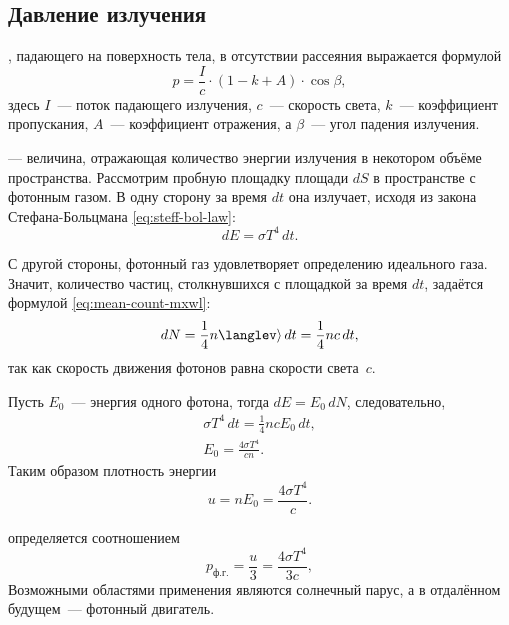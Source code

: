 \subsection{Давление излучения}
, падающего на поверхность тела, в отсутствии рассеяния выражается формулой
\begin{equation}
    p = \frac{I}{c} \cdot (1 - k + A) \cdot \cos \beta,
\end{equation}
здесь $I$~--- поток падающего излучения, $c$~--- скорость света, $k$~--- коэффициент пропускания, $A$~--- коэффициент отражения, а $\beta$~--- угол падения излучения.

 — величина, отражающая количество энергии излучения в некотором объёме пространства. Рассмотрим пробную  площадку площади $dS$ в пространстве с фотонным газом. В одну сторону за время $dt$ она излучает, исходя из закона Стефана-Больцмана \eqref{eq:steff-bol-law}:
\begin{equation*}
	d E = \sigma T^4 \, d t.
\end{equation*}

С другой стороны, фотонный газ удовлетворяет определению идеального газа. Значит, количество частиц, столкнувшихся с площадкой за время $dt$, задаётся формулой \eqref{eq:mean-count-mxwl}:
\begin{equation*}
d N = \frac{1}{4} n \langlev\rangle \, d t=\frac{1}{4} n c \, d t,
\end{equation*}
так как скорость движения фотонов равна скорости света~$c$.

Пусть $E_0$~--- энергия одного фотона, тогда $dE = E_0\,dN$, следовательно,
\begin{gather*}
    \sigma T^4 \, dt = \frac{1}{4} n c E_0 \, dt,\\
    E_0 = \frac{4 \sigma T^4}{c n}.
\end{gather*}
Таким образом плотность энергии
\begin{equation}
	u = n E_0 = \frac{4 \sigma T^4}{c}.
\end{equation}

 определяется соотношением
\begin{equation}
    p_\text{ф.г.} = \frac{u}{3} = \frac{4 \sigma T^4}{3c},
\end{equation}
Возможными областями применения являются солнечный парус, а в отдалённом будущем~--- фотонный двигатель.
